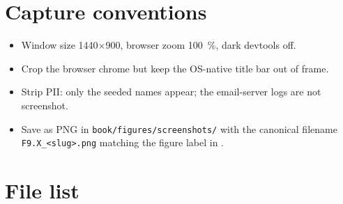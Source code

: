 \section{Capture conventions}

\begin{itemize}
  \item Window size 1440$\times$900, browser zoom 100~\%, dark devtools off.
  \item Crop the browser chrome but keep the OS-native title bar out of frame.
  \item Strip PII: only the seeded names appear; the email-server logs are not screenshot.
  \item Save as PNG in \texttt{book/figures/screenshots/} with the canonical filename \texttt{F9.X\_<slug>.png} matching the figure label in .
\end{itemize}

\section{File list}

